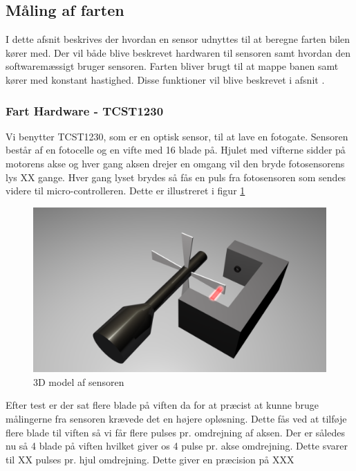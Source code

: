 


\subsection{Måling af farten}
\label{fartmål}
I dette afsnit beskrives der hvordan en sensor udnyttes til at beregne farten bilen kører med. Der vil både blive beskrevet hardwaren til sensoren samt hvordan den softwaremæssigt bruger sensoren. Farten bliver brugt til at mappe banen samt kører med konstant hastighed. Disse funktioner vil blive beskrevet i afsnit . \\

\subsubsection{Fart Hardware - TCST1230}
\label{fartmål_hardware}
Vi benytter TCST1230, som er en optisk sensor, til at lave en fotogate. Sensoren består af en fotocelle og en vifte med 16 blade på. Hjulet med vifterne sidder på motorens akse og hver gang aksen drejer en omgang vil den bryde fotosensorens lys XX gange. Hver gang lyset brydes så fås en puls fra fotosensoren som sendes videre til micro-controlleren. Dette er illustreret i figur \ref{wheelspeed3D} 

\begin{figure}[h!]
\center
\includegraphics[scale=0.2]{./Graphics/Wheelspeed_D}
\caption{3D model af sensoren}
\label{wheelspeed3D}
\end{figure}

Efter test er der sat flere blade på viften da for at præcist at kunne bruge målingerne fra sensoren krævede det en højere opløsning. Dette fås ved at tilføje flere blade til viften så vi får flere pulses pr. omdrejning af aksen. Der er således nu så 4 blade på viften hvilket giver os 4 pulse pr. akse omdrejning. Dette svarer til XX pulses pr. hjul omdrejning. Dette giver en præcision på XXX   \\


